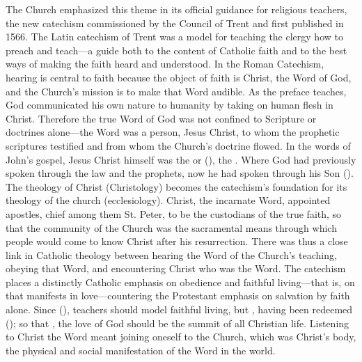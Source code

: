 The Church emphasized this theme in its official guidance for religious
teachers, the new catechism  commissioned by the
Council of Trent and first published in 1566.%
    \Autocites[]{Catholic:Catechismus1614}{NewCatholic}
The Latin catechism of Trent was a model for teaching the clergy how to preach
and teach---a guide both to the content of Catholic faith and to the best ways
of making the faith heard and understood.%
    \Autocite[]{NewCatholic}
In the Roman Catechism, hearing is central to faith because the object of faith
is Christ, the Word of God, and the Church's mission is to make that Word
audible.
As the preface teaches, God communicated his own nature to humanity by taking on
human flesh in Christ.
Therefore the true Word of God was not confined to Scripture or doctrines
alone---the Word was a person, Jesus Christ, to whom the prophetic scriptures
testified and from whom the Church's doctrine flowed.%
    \Autocite[9]{Catholic:Catechismus1614}
In the words of John's gospel, Jesus Christ himself was the  or
 (), the .
Where God had previously spoken through the law and the prophets, now he had
spoken through his Son ().
The theology of Christ (Christology) becomes the catechism's foundation for its
theology of the church (ecclesiology).
Christ, the incarnate Word, appointed apostles, chief among them St. Peter, to
be the custodians of the true faith, so that the community of the Church  was
the sacramental means through which people would come to know Christ after his
resurrection.
There was thus a close link in Catholic theology between hearing the Word of the
Church's teaching, obeying that Word, and encountering Christ who was the Word.
The catechism places a distinctly Catholic emphasis on obedience and faithful
living---that is, on  that manifests in love---countering
the Protestant emphasis on salvation by faith alone.
Since 
(), teachers should model faithful living,  but , having been redeemed 
(); so that , the love of God should be the summit of all Christian
life.%
    \Autocite[6--7]{Catholic:Catechismus1614}
Listening to Christ the Word meant joining oneself to the Church, which was
Christ's body, the physical and social manifestation of the Word in the world.

